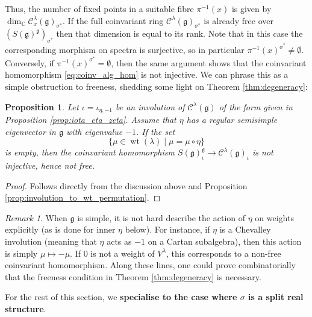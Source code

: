 \documentclass{amsart}
\newcommand{\C}{\mathbb{C}}
\newcommand{\Kir}{\mathcal{C}}
\newcommand{\g}{\mathfrak{g}}
\newcommand{\wt}{\operatorname{wt}}
\newcommand{\inv}{^{-1}}
\theoremstyle{definition}
\theoremstyle{plain}
\newtheorem{prop}[defn]{Proposition}
\theoremstyle{remark}
\newtheorem{rmk}[defn]{Remark}
\begin{document}
Thus, the number of fixed points in a suitable fibre $\pi\inv (x)$ is given by $\dim_\C \Kir^\lambda_x(\g)_{\sigma^*}$. If the full coinvariant ring $\Kir^\lambda(\g)_{\sigma^*}$ is already free over $(S(\g)^\g)_{\sigma^*}$ then that dimension is equal to its rank. Note that in this case the corresponding morphism on spectra is surjective, so in particular $\pi\inv (x)^{\sigma^*} \ne \emptyset$. Conversely, if $\pi\inv (x)^{\sigma^*} = \emptyset$, then the same argument shows that the coinvariant homomorphism \eqref{eq:coinv_alg_hom} is not injective. We can phrase this as a simple obstruction to freeness, shedding some light on Theorem \ref{thm:degeneracy}:
\begin{prop}
\label{prop:freeness_obstruction}
    Let $\iota = \iota_{\eta, -1}$ be an involution of $\Kir^\lambda(\g)$ of the form given in Proposition \ref{prop:iota_eta_zeta}. Assume that $\eta$ has a regular semisimple eigenvector in $\g$ with eigenvalue $-1$. If the set
    $$
        \{\mu \in \wt(\lambda) \mid \mu = \mu \circ \eta \}
    $$
    is empty, then the coinvariant homomorphism $S(\g)^\g_\iota \to \Kir^\lambda(\g)_\iota$ is not injective, hence not free.
\end{prop}
\begin{proof}
    Follows directly from the discussion above and Proposition \ref{prop:involution_to_wt_permutation}.
\end{proof}
\begin{rmk}
    When $\g$ is simple, it is not hard describe the action of $\eta$ on weights explicitly (as is done for inner $\eta$ below). For instance, if $\eta$ is a Chevalley involution (meaning that $\eta$ acts as $-1$ on a Cartan subalgebra), then this action is simply $\mu\mapsto -\mu$. If $0$ is not a weight of $V^\lambda$, this corresponds to a non-free coinvariant homomorphism. Along these lines, one could prove combinatorially that the freeness condition in Theorem \ref{thm:degeneracy} is necessary.
\end{rmk} 

For the rest of this section, we \textbf{specialise to the case where $\sigma$ is a split real structure}. 
\end{document}
